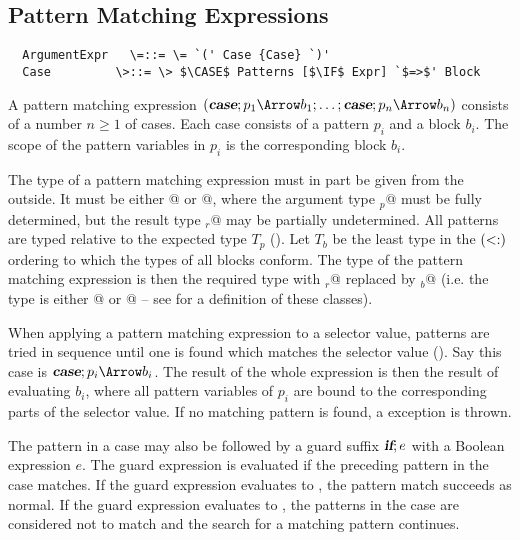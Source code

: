 \documentclass[11pt]{report}
\begin{document}
\subsection{Pattern Matching Expressions}
\label{sec:pattern-match}

\syntax\begin{verbatim}
  ArgumentExpr   \=::= \= `(' Case {Case} `)'
  Case	       \>::= \> $\CASE$ Patterns [$\IF$ Expr] `$=>$' Block
\end{verbatim}

A pattern matching expression $(\CASE;p_1 \Arrow b_1 ;\ldots; \CASE;p_n
\Arrow b_n)$ consists of a number $n \geq 1$ of cases.  Each case
consists of a pattern $p_i$ and a block $b_i$.  The scope
of the pattern variables in $p_i$ is the corresponding block
$b_i$.

The type of a pattern matching expression must in part be given from
the outside. It must be either \verb@Function[T$_p$, T$_r$]@ or
\verb@PartialFunction[T$_p$, T$_r$]@, where the argument type
\verb@T$_p$@ must be fully determined, but the result type \verb@T$_r$@
may be partially undetermined.  All patterns are typed relative to the
expected type $T_p$ ().  Let $T_b$ be the least
type in the $(<:)$ ordering to which the types of all blocks
conform.  The type of the pattern matching expression is then the
required type with \verb@T$_r$@ replaced by \verb@T$_b$@ (i.e. the
type is either \verb@Function[T$_p$, T$_b$]@ or
\verb@PartialFunction[T$_p$, T$_b$]@ -- see  for
a definition of these classes).

When applying a pattern matching expression to a selector value,
patterns are tried in sequence until one is found which matches the
selector value (). Say this case is $\CASE;p_i
\Arrow b_i$.  The result of the whole expression is then the result of
evaluating $b_i$, where all pattern variables of $p_i$ are bound to
the corresponding parts of the selector value.  If no matching pattern
is found, a \verb@MatchError@ exception is thrown.

The pattern in a case may also be followed by a guard suffix $\mbox{\sl\bfseries if};e$
with a Boolean expression $e$.  The guard expression is evaluated if
the preceding pattern in the case matches. If the guard expression
evaluates to \verb@True@, the pattern match succeeds as normal. If the
guard expression evaluates to \verb@False@, the patterns in the case
are considered not to match and the search for a matching pattern
continues.
\end{document}

